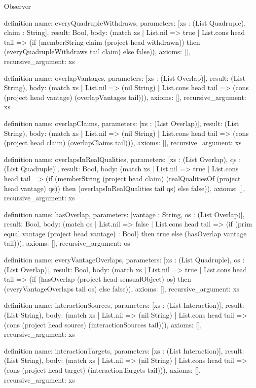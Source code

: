 \begin{lexlean}{Observer}
\begin{semanticmodule}
definition{
  name: everyQuadrupleWithdraws,
  parameters: [xs : (List Quadruple), claim : String],
  result: Bool,
  body: (match xs
    | List.nil => true
    | List.cons head tail => (if (memberString claim (project head withdrawn)) then (everyQuadrupleWithdraws tail claim) else false)),
  axioms: [],
  recursive_argument: xs
}

definition{
  name: overlapVantages,
  parameters: [xs : (List Overlap)],
  result: (List String),
  body: (match xs
    | List.nil => (nil String)
    | List.cons head tail => (cons (project head vantage) (overlapVantages tail))),
  axioms: [],
  recursive_argument: xs
}

definition{
  name: overlapClaims,
  parameters: [xs : (List Overlap)],
  result: (List String),
  body: (match xs
    | List.nil => (nil String)
    | List.cons head tail => (cons (project head claim) (overlapClaims tail))),
  axioms: [],
  recursive_argument: xs
}

definition{
  name: overlapsInRealQualities,
  parameters: [xs : (List Overlap), qs : (List Quadruple)],
  result: Bool,
  body: (match xs
    | List.nil => true
    | List.cons head tail => (if (memberString (project head claim) (realQualitiesOf (project head vantage) qs)) then (overlapsInRealQualities tail qs) else false)),
  axioms: [],
  recursive_argument: xs
}

definition{
  name: hasOverlap,
  parameters: [vantage : String, os : (List Overlap)],
  result: Bool,
  body: (match os
    | List.nil => false
    | List.cons head tail => (if (prim equal vantage (project head vantage) : Bool) then true else (hasOverlap vantage tail))),
  axioms: [],
  recursive_argument: os
}

definition{
  name: everyVantageOverlaps,
  parameters: [xs : (List Quadruple), os : (List Overlap)],
  result: Bool,
  body: (match xs
    | List.nil => true
    | List.cons head tail => (if (hasOverlap (project head sensualObject) os) then (everyVantageOverlaps tail os) else false)),
  axioms: [],
  recursive_argument: xs
}

definition{
  name: interactionSources,
  parameters: [xs : (List Interaction)],
  result: (List String),
  body: (match xs
    | List.nil => (nil String)
    | List.cons head tail => (cons (project head source) (interactionSources tail))),
  axioms: [],
  recursive_argument: xs
}

definition{
  name: interactionTargets,
  parameters: [xs : (List Interaction)],
  result: (List String),
  body: (match xs
    | List.nil => (nil String)
    | List.cons head tail => (cons (project head target) (interactionTargets tail))),
  axioms: [],
  recursive_argument: xs
}


\end{semanticmodule}
\end{lexlean}

